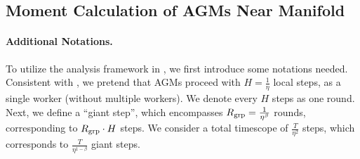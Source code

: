 
\subsection{Moment Calculation of AGMs Near Manifold}\label{sec:momen-calculation}

\paragraph{Additional Notations.}
To utilize the analysis framework in \citet{gu2023andwhendoeslocal}, we first introduce some notations needed. Consistent with \citet{gu2023andwhendoeslocal}, we pretend that AGMs proceed with $H=\frac{1}{\eta}$ local steps, as a single worker (without multiple workers). We denote every $H$ steps as one round. Next, we define a ``giant step'', which encompasses $R_{\mathrm{grp}}=\frac{1}{\eta^{\beta}}$ rounds, corresponding to $R_{\mathrm{grp}}\cdot H$ steps. We consider a total timescope of $\frac{T}{\eta^2}$ steps, which corresponds to $\frac{T}{\eta^{1-\beta}}$ giant steps. 


